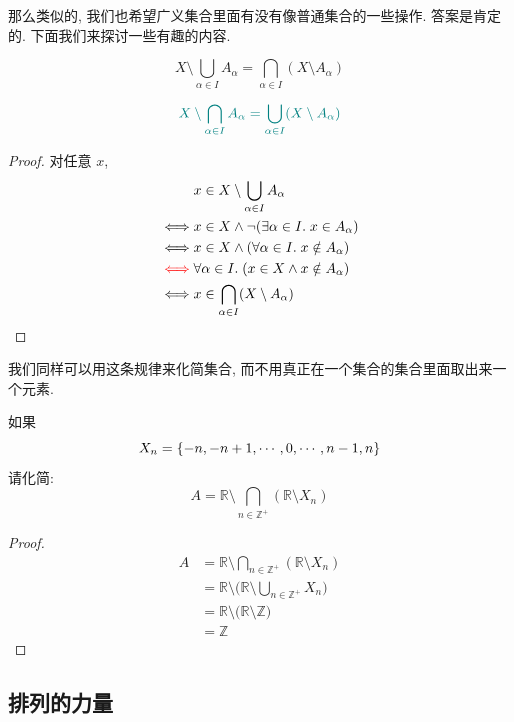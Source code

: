 那么类似的, 我们也希望广义集合里面有没有像普通集合的一些操作. 答案是肯定的. 下面我们来探讨一些有趣的内容. 

\begin{theorem}[德摩根律]
  \[
    X \setminus \bigcup_{\alpha \in I} A_{\alpha} = \bigcap_{\alpha \in I} (X \setminus A_{\alpha})
  \]

  \[
    \textcolor{teal}{X \setminus \bigcap_{\alpha \in I} A_{\alpha} = \bigcup_{\alpha \in I} (X \setminus A_{\alpha})}
  \]
\end{theorem}

\begin{proof}
  对任意 $x$,
  \setcounter{equation}{0}
  \begin{align*}
    &x \in X \setminus \bigcup_{\alpha \in I} A_{\alpha} \\
    \iff & x \in X \land \lnot(\exists \alpha \in I.\; x \in A_{\alpha}) \\
    \iff & x \in X \land (\forall \alpha \in I.\; x \notin A_{\alpha}) \\
    \textcolor{red}{\iff} & \forall \alpha \in I.\; (x \in X \land x \notin A_{\alpha}) \\
    \iff & x \in \bigcap_{\alpha \in I} (X \setminus A_{\alpha})
  \end{align*}
\end{proof}

我们同样可以用这条规律来化简集合, 而不用真正在一个集合的集合里面取出来一个元素. 

\begin{eg}
  如果
  \[
    X_n = \{-n, -n+1, \cdots, 0, \cdots, n-1, n\}
  \]
  请化简: 
  $$A = \mathbb{R} \setminus \bigcap_{n \in \mathbb{Z}^{+}} (\mathbb{R} \setminus X_n) $$
\end{eg}
\begin{proof}
  \begin{align*}
    A &= \mathbb{R} \setminus \bigcap_{n \in \mathbb{Z}^{+}} (\mathbb{R} \setminus X_n) \\
    &= \mathbb{R} \setminus \Big(\mathbb{R} \setminus \bigcup_{n \in \mathbb{Z}^{+}} X_n \Big) \\
    &= \mathbb{R} \setminus \Big(\mathbb{R} \setminus \mathbb{Z} \Big) \\
    &= \mathbb{Z}
  \end{align*}
\end{proof}

\subsection{排列的力量}

